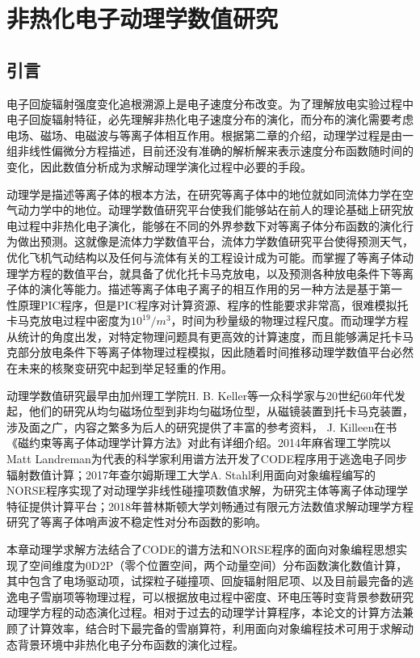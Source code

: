 \chapter{非热化电子动理学数值研究}
\section*{引言}
电子回旋辐射强度变化追根溯源上是电子速度分布改变。为了理解放电实验过程中电子回旋辐射特征，必先理解非热化电子速度分布的演化，而分布的演化需要考虑电场、磁场、电磁波与等离子体相互作用。根据第二章的介绍，动理学过程是由一组非线性偏微分方程描述，目前还没有准确的解析解来表示速度分布函数随时间的变化，因此数值分析成为求解动理学演化过程中必要的手段。


动理学是描述等离子体的根本方法，在研究等离子体中的地位就如同流体力学在空气动力学中的地位。动理学数值研究平台使我们能够站在前人的理论基础上研究放电过程中非热化电子演化，能够在不同的外界参数下对等离子体分布函数的演化行为做出预测。这就像是流体力学数值平台，流体力学数值研究平台使得预测天气，优化飞机气动结构以及任何与流体有关的工程设计成为可能。而掌握了等离子体动理学方程的数值平台，就具备了优化托卡马克放电，以及预测各种放电条件下等离子体的演化等能力。描述等离子体电子离子的相互作用的另一种方法是基于第一
性原理PIC程序\cite{RN2071}，但是PIC程序对计算资源、程序的性能要求非常高，很难模拟托卡马克放电过程中密度为$10^{19}/m^3$，时间为秒量级的物理过程尺度。而动理学方程从统计的角度出发，对特定物理问题具有更高效的计算速度，而且能够满足托卡马克部分放电条件下等离子体物理过程模拟，因此随着时间推移动理学数值平台必然在未来的核聚变研究中起到举足轻重的作用。
\par 动理学数值研究最早由加州理工学院H. B. Keller等一众科学家与20世纪60年代发起，他们的研究从均匀磁场位型到非均匀磁场位型，从磁镜装置到托卡马克装置，涉及面之广，内容之繁多为后人的研究提供了丰富的参考资料， J. Killeen在书《磁约束等离子体动理学计算方法》\cite{RN1827}对此有详细介绍。2014年麻省理工学院以Matt Landreman为代表的科学家利用谱方法开发了CODE程序用于逃逸电子同步辐射数值计算\cite{RN814}；2017年查尔姆斯理工大学A. Stahl利用面向对象编程编写的NORSE程序\cite{RN1894}实现了对动理学非线性碰撞项数值求解，为研究主体等离子体动理学特征提供计算平台；2018年普林斯顿大学刘畅通过有限元方法数值求解动理学方程研究了等离子体哨声波不稳定性对分布函数的影响\cite{RN1815}。

本章动理学求解方法结合了CODE的谱方法和NORSE程序的面向对象编程思想实现了空间维度为0D2P（零个位置空间，两个动量空间）分布函数演化数值计算，其中包含了电场驱动项，试探粒子碰撞项、回旋辐射阻尼项、以及目前最完备的逃逸电子雪崩项等物理过程，可以根据放电过程中密度、环电压等时变背景参数研究动理学方程的动态演化过程。相对于过去的动理学计算程序，本论文的计算方法兼顾了计算效率，结合时下最完备的雪崩算符，利用面向对象编程技术可用于求解动态背景环境中非热化电子分布函数的演化过程。




